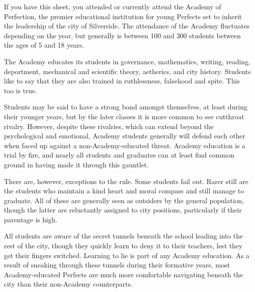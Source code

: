 \documentclass[blue]{Silversiders}
\begin{document}
\name{\bAcademy{}}

If you have this sheet, you attended or currently attend the Academy of Perfection, the premier educational institution for young Perfects set to inherit the leadership of the city of Silverside. The attendance of the Academy fluctuates depending on the year, but generally is between 100 and 300 students between the ages of 5 and 18 years.

The Academy educates its students in governance, mathematics, writing, reading, deportment, mechanical and scientific theory, aetherics, and city history. Students like to say that they are also trained in ruthlessness, falsehood and spite. This too is true.

Students may be said to have a strong bond amongst themselves, at least during their younger years, but by the later classes it is more common to see cutthroat rivalry. However, despite these rivalries, which can extend beyond the psychological and emotional, Academy students generally will defend each other when faced up against a non-Academy-educated threat. Academy education is a trial by fire, and nearly all students and graduates can at least find common ground in having made it through this gauntlet.

There are, however, exceptions to the rule. Some students fail out. Rarer still are the students who maintain a kind heart and moral compass and still manage to graduate. All of these are generally seen as outsiders by the general population, though the latter are reluctantly assigned to city positions, particularly if their parentage is high.

All students are aware of the secret tunnels beneath the school leading into the rest of the city, though they quickly learn to deny it to their teachers, lest they get their fingers switched. Learning to lie is part of any Academy education. As a result of sneaking through these tunnels during their formative years, most Academy-educated Perfects are much more comfortable navigating beneath the city than their non-Academy counterparts.
\end{document}
